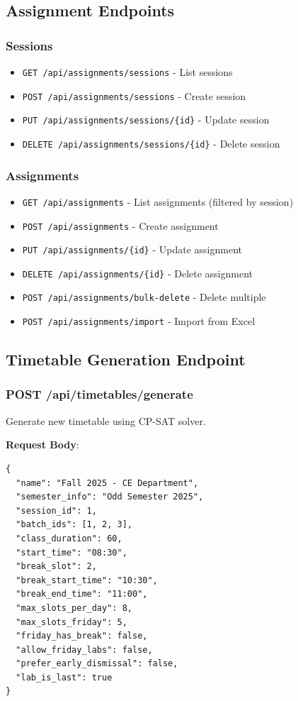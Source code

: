 \documentclass[12pt,a4paper]{article}
\begin{document}
\subsection{Assignment Endpoints}

\subsubsection{Sessions}
\begin{itemize}
    \item \texttt{GET /api/assignments/sessions} - List sessions
    \item \texttt{POST /api/assignments/sessions} - Create session
    \item \texttt{PUT /api/assignments/sessions/\{id\}} - Update session
    \item \texttt{DELETE /api/assignments/sessions/\{id\}} - Delete session
\end{itemize}

\subsubsection{Assignments}
\begin{itemize}
    \item \texttt{GET /api/assignments} - List assignments (filtered by session)
    \item \texttt{POST /api/assignments} - Create assignment
    \item \texttt{PUT /api/assignments/\{id\}} - Update assignment
    \item \texttt{DELETE /api/assignments/\{id\}} - Delete assignment
    \item \texttt{POST /api/assignments/bulk-delete} - Delete multiple
    \item \texttt{POST /api/assignments/import} - Import from Excel
\end{itemize}


\subsection{Timetable Generation Endpoint}

\subsubsection{POST /api/timetables/generate}
Generate new timetable using CP-SAT solver.

\textbf{Request Body}:
\begin{verbatim}
{
  "name": "Fall 2025 - CE Department",
  "semester_info": "Odd Semester 2025",
  "session_id": 1,
  "batch_ids": [1, 2, 3],
  "class_duration": 60,
  "start_time": "08:30",
  "break_slot": 2,
  "break_start_time": "10:30",
  "break_end_time": "11:00",
  "max_slots_per_day": 8,
  "max_slots_friday": 5,
  "friday_has_break": false,
  "allow_friday_labs": false,
  "prefer_early_dismissal": false,
  "lab_is_last": true
}
\end{verbatim}
\end{document}
